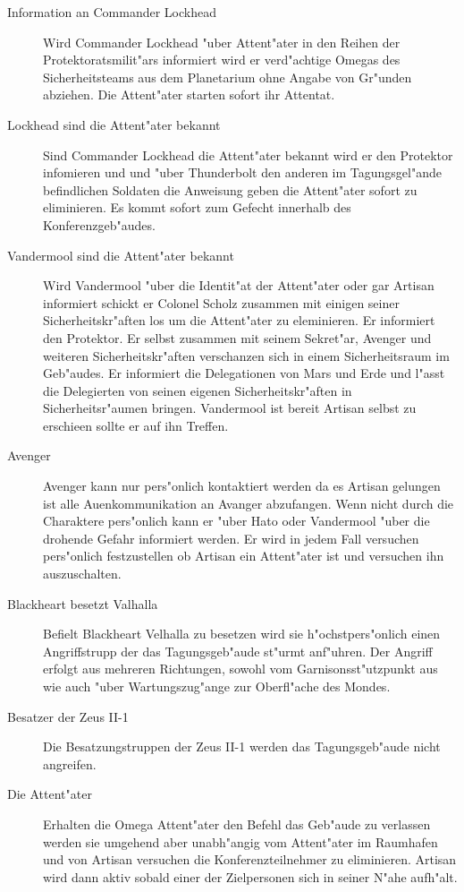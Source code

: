 \begin{description}
	\item[Information an Commander Lockhead] Wird Commander Lockhead "uber Attent"ater in den Reihen der Protektoratsmilit"ars informiert 
		wird er verd"achtige Omegas des Sicherheitsteams aus dem Planetarium ohne Angabe von Gr"unden abziehen. Die Attent"ater starten sofort ihr Attentat.
	\item[Lockhead sind die Attent"ater bekannt] Sind Commander Lockhead die Attent"ater bekannt wird er den Protektor infomieren und 
		und "uber Thunderbolt den anderen im Tagungsgel"ande befindlichen Soldaten die Anweisung geben die Attent"ater sofort zu eliminieren. Es kommt sofort zum Gefecht innerhalb des Konferenzgeb"audes.
	\item[Vandermool sind die Attent"ater bekannt] Wird Vandermool "uber die Identit"at der Attent"ater oder gar Artisan informiert schickt 	er Colonel Scholz zusammen mit einigen seiner Sicherheitskr"aften los um die Attent"ater zu eleminieren. Er informiert den 
		Protektor. Er selbst zusammen mit seinem Sekret"ar, Avenger und weiteren Sicherheitskr"aften verschanzen sich in einem Sicherheitsraum im Geb"audes. Er informiert die Delegationen von Mars und Erde und l"asst die Delegierten von seinen eigenen Sicherheitskr"aften in Sicherheitsr"aumen bringen. Vandermool ist bereit Artisan selbst zu erschie\3en sollte er auf ihn Treffen.
	\item[Avenger] Avenger kann nur pers"onlich kontaktiert werden da es Artisan gelungen ist alle Au\3enkommunikation an Avanger 	
		abzufangen. Wenn nicht durch die Charaktere pers"onlich kann er "uber Hato oder Vandermool "uber die drohende Gefahr informiert werden. Er wird in jedem Fall versuchen pers"onlich festzustellen ob Artisan ein Attent"ater ist und versuchen ihn auszuschalten.
	\item[Blackheart besetzt Valhalla] Befielt Blackheart Velhalla zu besetzen wird sie h"ochstpers"onlich einen Angriffstrupp der das 
		Tagungsgeb"aude st"urmt anf"uhren. Der Angriff erfolgt aus mehreren Richtungen, sowohl vom Garnisonsst"utzpunkt aus wie auch "uber Wartungszug"ange zur Oberfl"ache des Mondes.
	\item[Besatzer der Zeus II-1] Die Besatzungstruppen der Zeus II-1 werden das Tagungsgeb"aude nicht angreifen.
	\item[Die Attent"ater] Erhalten die Omega Attent"ater den Befehl das Geb"aude zu verlassen werden sie umgehend aber unabh"angig vom 
		Attent"ater im Raumhafen und von Artisan versuchen die Konferenzteilnehmer zu eliminieren. Artisan wird dann aktiv sobald einer der Zielpersonen sich in seiner N"ahe aufh"alt.
\end{description}


